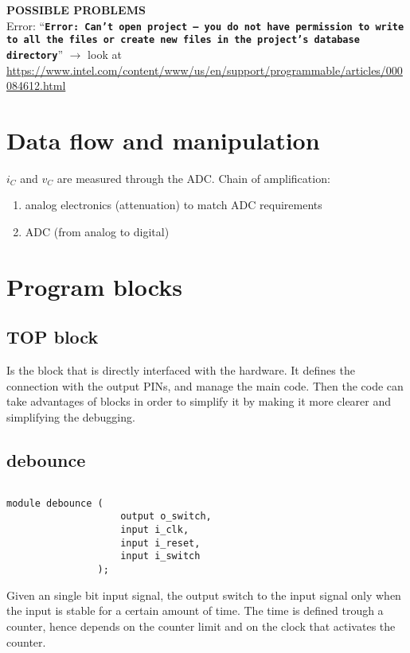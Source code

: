 \documentclass[a4paper,10pt,twoside]{article}
\newcommand{\0}{\textbf{0}}
\newcommand{\1}{\textbf{1}}
\newcommand{\code}[1]{{\color{Mulberry}\textbf{\texttt{#1}}}}
\begin{document}
   \textbf{POSSIBLE PROBLEMS}\\
   Error: ``\code{Error: Can't open project -- you do not have permission to write to all the files or create new files in the project's database directory}'' $\rightarrow$ look at \url{https://www.intel.com/content/www/us/en/support/programmable/articles/000084612.html}


\section{Data flow and manipulation}
    $i_C$ and $v_C$ are measured through the ADC. Chain of amplification:
        \begin{enumerate}
            \item analog electronics (attenuation) to match ADC requirements
            \item ADC (from analog to digital)
        \end{enumerate}

\section{Program blocks}

    \subsection{TOP block}
        Is the block that is directly interfaced with the hardware. It defines the connection with the output PINs, and manage the main code. Then the code can take advantages of blocks in order to simplify it by making it more clearer and simplifying the debugging.

    \subsection{debounce}
        
        \begin{minipage}{0.1\textwidth}
            $ $
        \end{minipage}
        \begin{minipage}{0.3\textwidth}
            \begin{lstlisting}[style={verilog-style}]
                module debounce (
                    output o_switch,
                    input i_clk,
                    input i_reset,
                    input i_switch
                );
            \end{lstlisting}
        \end{minipage}\quad
        \begin{minipage}{0.5\textwidth}
            Given an single bit input signal, the output switch to the input signal only when the input is stable for a certain amount of time. The time is defined trough a counter, hence depends on the counter limit and on the clock that activates the counter.
        \end{minipage}
\end{document}
